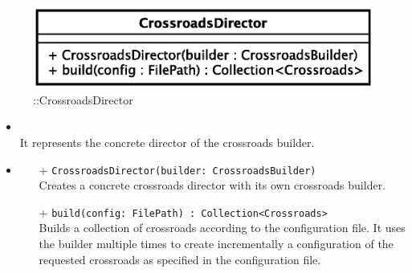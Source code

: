 \begin{figure}[h]
\centering
\includegraphics[scale=0.6,keepaspectratio]{images/solution/crossroads_director.eps}
\caption{\pReactiveBuild::CrossroadsDirector}
\label{fig:sd-app-crossroads_director}
\end{figure}
\FloatBarrier
\begin{itemize}
  \item \textbf{\descr} \\
    It represents the concrete director of the crossroads builder.
  \item \textbf{\ops}
  \begin{itemize} 
    \item[+] \texttt{CrossroadsDirector(builder: CrossroadsBuilder)} \\
Creates a concrete crossroads director with its own crossroads builder.
    \item[+] \texttt{build(config: FilePath) : Collection<Crossroads>} \\
Builds a collection of crossroads according to the configuration file. 
It uses the builder multiple times 
to create incrementally a configuration of the requested crossroads as specified
in the configuration file. 
  \end{itemize}
\end{itemize}
